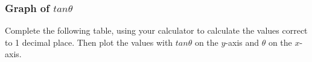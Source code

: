             \subsubsection{  Graph of $tan\theta $ }
            \nopagebreak
             \label{m39414*uid982734}Complete the following table, using your calculator to calculate the values correct to 1 decimal place. Then plot the values with \begin{math}tan\theta \end{math} on the \begin{math}y\end{math}-axis and \begin{math}\theta \end{math} on the \begin{math}x\end{math}-axis.\par 
        
    
      
